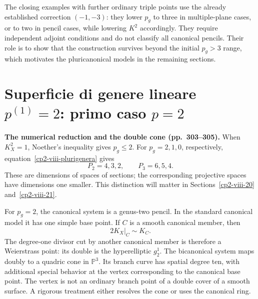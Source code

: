 The closing examples with further ordinary triple points use the already established correction \((-1,-3)\): they lower \(p_g\) to three in multiple-plane cases, or to two in pencil cases, while lowering \(K^2\) accordingly. They require independent adjoint conditions and do not classify all canonical pencils. Their role is to show that the construction survives beyond the initial \(p_g>3\) range, which motivates the pluricanonical models in the remaining sections.

\section{Superficie di genere lineare \texorpdfstring{$p^{(1)}=2$}{p(1)=2}: primo caso \texorpdfstring{$p=2$}{p=2}}
\label{cp2-viii-14}

\textbf{The numerical reduction and the double cone (pp.~303--305).}
When \(K_X^2=1\), Noether's inequality gives \(p_g\leq2\). For \(p_g=2,1,0\), respectively, equation~\eqref{cp2-viii-plurigenera} gives
\[
P_2=4,3,2,\qquad P_3=6,5,4.
\]
These are dimensions of spaces of sections; the corresponding projective spaces have dimensions one smaller. This distinction will matter in Sections~\ref{cp2-viii-20} and~\ref{cp2-viii-21}.

For \(p_g=2\), the canonical system is a genus-two pencil. In the standard canonical model it has one simple base point. If \(C\) is a smooth canonical member, then
\[
2K_X|_C\sim K_C.
\]
The degree-one divisor cut by another canonical member is therefore a Weierstrass point: its double is the hyperelliptic \(g^1_2\). The bicanonical system maps doubly to a quadric cone in \(\mathbb P^3\). Its branch curve has spatial degree ten, with additional special behavior at the vertex corresponding to the canonical base point. The vertex is not an ordinary branch point of a double cover of a smooth surface. A rigorous treatment either resolves the cone or uses the canonical ring.

